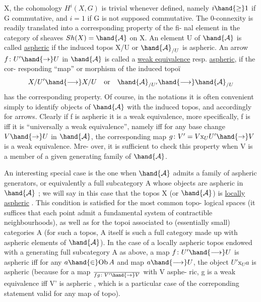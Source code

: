 X, the cohomology  $H^i(X,G)$  is trivial whenever defined, namely 
$i\hand{\geq}1$ if G commutative, and $i=1$ if G is not supposed commutative. The
0-connexity is readily translated into a corresponding property of the fi-%
nal element in the category of sheaves $Sh(X)=\hand{\mathcal{A}}$ on X. An element  U of $\hand{\mathcal{A}}$
is called \uline{aspheric} if the induced topos X/U or $\hand{\mathcal{A}}_{/U}$ is aspheric. An arrow
$f\colon U'\hand{\to} U$ in $\hand{\mathcal{A}}$ is called a \uline{weak equivalence} resp. \uline{aspheric}, if the cor-%
responding ``map'' or morphism of the induced topoï
\[ X/U'\hand{\longrightarrow} X/U \quad\text{or}\quad \hand{\mathcal{A}}_{/U'}\hand{\longrightarrow}\hand{\mathcal{A}}_{/U} \]
has the corresponding property. Of course, in the notations it is often
convenient simply to identify objects  of $\hand{\mathcal{A}}$ with the induced topos, and
accordingly for arrows.  Clearly if f is aspheric it is a
weak equivalence, more specifically, f is  iff it is
``universally a weak equivalence'', namely iff for any base change $V\hand{\to}U$ in
$\hand{\mathcal{A}}$, the corresponding map $g\colon V'=V\mathrm{x}_U U'\hand{\to}V$ is a weak equivalence. Mre-%
over, it is sufficient to check this property when V is a member of a
given generating family of $\hand{\mathcal{A}}$.

An interesting special case is the one when $\hand{\mathcal{A}}$ admits a family of
aspheric generators, or equivalently a  full subcategory A whose objects
are aspheric in $\hand{\mathcal{A}}$ ; we will say in this case that the topos X (or $\hand{\mathcal{A}}$) is
\hand{*}\uline{locally aspheric} . This condition is satisfied for the most common topo-%
logical spaces (it suffices that each point admit a fundamental system of
contractible neighbourhoods), as well as for the topoi  associated to
(essentially small) categories A (for such a topos, A itself is such a
 full category made up with aspheric elements of $\hand{\mathcal{A}}$). In the case of a
locally aspheric topos endowed with a generating full subcategory A as
above, a map $f\colon U'\hand{\longrightarrow} U$ is aspheric iff for any $a \hand{\in} \mathrm{Ob}\,A$ and map $a\hand{\longrightarrow} U$,
the object $U'\mathrm{x}_U a$ is aspheric (because for a map $\over{f}{g}\colon V'\hand{\to} V$ with V asphe-%
ric, g is a weak equivalence iff V' is aspheric , which is a particular
case of the correponding statement valid for any map of topo).

